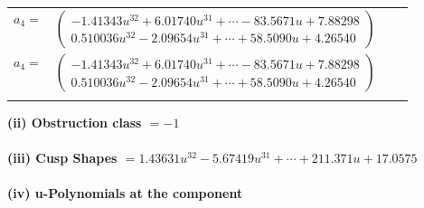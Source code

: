 \documentclass[1p]{elsarticle_modified}
\theoremstyle{definition}
\begin{document}
\begin{tabular}{m{7pt} m{180pt} m{7pt} m{180pt} }
\flushright $a_{4}=$&$\begin{pmatrix}-1.41343 u^{32}+6.01740 u^{31}+\cdots-83.5671 u+7.88298\\0.510036 u^{32}-2.09654 u^{31}+\cdots+58.5090 u+4.26540\end{pmatrix}$\\ \flushright $a_{4}=$&$\begin{pmatrix}-1.41343 u^{32}+6.01740 u^{31}+\cdots-83.5671 u+7.88298\\0.510036 u^{32}-2.09654 u^{31}+\cdots+58.5090 u+4.26540\end{pmatrix}$\\&\end{tabular}
\flushleft \textbf{(ii) Obstruction class $= -1$}\\~\\
\flushleft \textbf{(iii) Cusp Shapes $= 1.43631 u^{32}-5.67419 u^{31}+\cdots+211.371 u+17.0575$}\\~\\
\newpage\renewcommand{\arraystretch}{1}
\flushleft \textbf{(iv) u-Polynomials at the component}\newline \\
\end{document}
